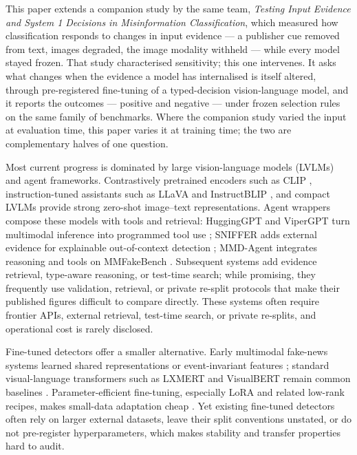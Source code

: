 \documentclass{article} %
\begin{document}
This paper extends a companion study by the same team, \emph{Testing Input Evidence and System 1 Decisions in Misinformation Classification}, which measured how classification responds to changes in input evidence --- a publisher cue removed from text, images degraded, the image modality withheld --- while every model stayed frozen. That study characterised sensitivity; this one intervenes. It asks what changes when the evidence a model has internalised is itself altered, through pre-registered fine-tuning of a typed-decision vision-language model, and it reports the outcomes --- positive and negative --- under frozen selection rules on the same family of benchmarks. Where the companion study varied the input at evaluation time, this paper varies it at training time; the two are complementary halves of one question.

Most current progress is dominated by large vision-language models (LVLMs) and agent frameworks. Contrastively pretrained encoders such as CLIP \citep{Radford2021LearningTransferable}, instruction-tuned assistants such as LLaVA and InstructBLIP \citep{Liu2023VisualInstruction, Dai2023InstructblipTowards}, and compact LVLMs \citep{Zhu2024LlavaphiEfficient} provide strong zero-shot image--text representations. Agent wrappers compose these models with tools and retrieval: HuggingGPT and ViperGPT turn multimodal inference into programmed tool use \citep{Shen2023HugginggptSolving, Surs2023VipergptVisual}; SNIFFER adds external evidence for explainable out-of-context detection \citep{Qi2024SnifferMultimodal}; MMD-Agent integrates reasoning and tools on MMFakeBench \citep{Liu2024MmfakebenchMixedsource}. Subsequent systems add evidence retrieval, type-aware reasoning, or test-time search; while promising, they frequently use validation, retrieval, or private re-split protocols that make their published figures difficult to compare directly. These systems often require frontier APIs, external retrieval, test-time search, or private re-splits, and operational cost is rarely disclosed.

Fine-tuned detectors offer a smaller alternative. Early multimodal fake-news systems learned shared representations or event-invariant features \citep{Khattar2019MvaeMultimodal, Wang2018EannEvent, Singhal2019SpotfakeMultimodal}; standard visual-language transformers such as LXMERT and VisualBERT remain common baselines \citep{Tan2019LxmertLearning, Li2019VisualbertSimple}. Parameter-efficient fine-tuning, especially LoRA and related low-rank recipes, makes small-data adaptation cheap \citep{Hu2021LoraLowrank, Kalajdzievski2023RankStabilization, Shuttleworth2024LoraVs}. Yet existing fine-tuned detectors often rely on larger external datasets, leave their split conventions unstated, or do not pre-register hyperparameters, which makes stability and transfer properties hard to audit.
\end{document}
